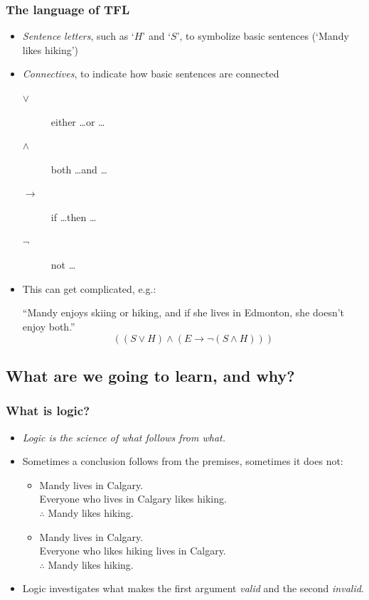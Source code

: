 \begin{frame}
  \frametitle{The language of TFL}

  \begin{itemize}[<+->]
  \item \emph{Sentence letters}, such as `$H$' and `$S$', to symbolize basic sentences (`Mandy likes hiking')
  \item \emph{Connectives}, to indicate how basic sentences are connected
  \begin{description}
    \item[$\lor$] either \dots or \dots
    \item[$\land$] both \dots and \dots
    \item[$\to$] if \dots then \dots
    \item[$\lnot$] not \dots
  \end{description}

  \item[] This can get complicated, e.g.:

  ``Mandy enjoys skiing or hiking, and if she lives in Edmonton, she
  doesn't enjoy both.''
  \[
  ((S \lor H) \land (E \to \lnot(S \land H)))
  \]
  \end{itemize}
\end{frame}

\subsection{What are we going to learn, and why?}

\begin{frame}
  \frametitle{What is logic?}

  \begin{itemize}[<+->]
  \item \emph{Logic is the science of what follows from what.}
  \item Sometimes a conclusion follows from the premises, sometimes it
  does not:
  \begin{itemize}[<+->]
    \item Mandy lives in Calgary.\\ Everyone who lives in Calgary likes hiking.\\
    $\therefore$ Mandy likes hiking.
    \item Mandy lives in Calgary.\\ Everyone who likes hiking lives in Calgary.\\
    $\therefore$ Mandy likes hiking.
    \end{itemize}
  \item Logic investigates what makes the first argument \emph{valid}
    and the second \emph{invalid}.
  \end{itemize}
\end{frame}

